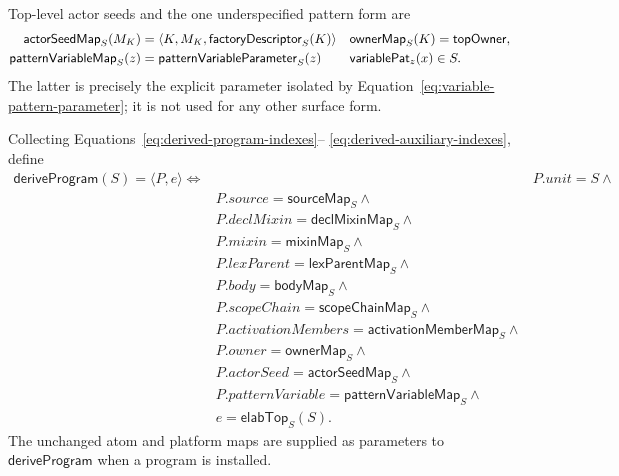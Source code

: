 Top-level actor seeds and the one underspecified pattern form are
\begin{equation}\label{eq:derived-auxiliary-indexes}
\begin{aligned}
 \mathsf{actorSeedMap}_{S}(M_K)&=
   \langle K,M_K,\mathsf{factoryDescriptor}_{S}(K)\rangle
   &&\mathsf{ownerMap}_{S}(K)=\mathsf{topOwner},\\
 \mathsf{patternVariableMap}_{S}(z)&=
   \mathsf{patternVariableParameter}_{S}(z)
   &&\mathsf{variablePat}_{z}(x)\in S.
\end{aligned}
\end{equation}
The latter is precisely the explicit parameter isolated by
Equation~\eqref{eq:variable-pattern-parameter}; it is not used for any other
surface form.

Collecting Equations~\eqref{eq:derived-program-indexes}--
\eqref{eq:derived-auxiliary-indexes}, define
\begin{equation}\label{eq:declaration-derivation}
\begin{aligned}
 \mathsf{deriveProgram}(S)=\langle P,e\rangle
 \Longleftrightarrow{}&
 &P.\mathit{unit}=S\land\\
 &P.\mathit{source}=\mathsf{sourceMap}_{S}\land\\
 &P.\mathit{declMixin}=\mathsf{declMixinMap}_{S}\land\\
 &P.\mathit{mixin}=\mathsf{mixinMap}_{S}\land\\
 &P.\mathit{lexParent}=\mathsf{lexParentMap}_{S}\land\\
 &P.\mathit{body}=\mathsf{bodyMap}_{S}\land\\
 &P.\mathit{scopeChain}=\mathsf{scopeChainMap}_{S}\land\\
 &P.\mathit{activationMembers}=\mathsf{activationMemberMap}_{S}\land\\
 &P.\mathit{owner}=\mathsf{ownerMap}_{S}\land\\
 &P.\mathit{actorSeed}=\mathsf{actorSeedMap}_{S}\land\\
 &P.\mathit{patternVariable}=\mathsf{patternVariableMap}_{S}\land\\
 &e=\mathsf{elabTop}_{S}(S).
\end{aligned}
\end{equation}
The unchanged atom and platform maps are supplied as parameters to
$\mathsf{deriveProgram}$ when a program is installed.

